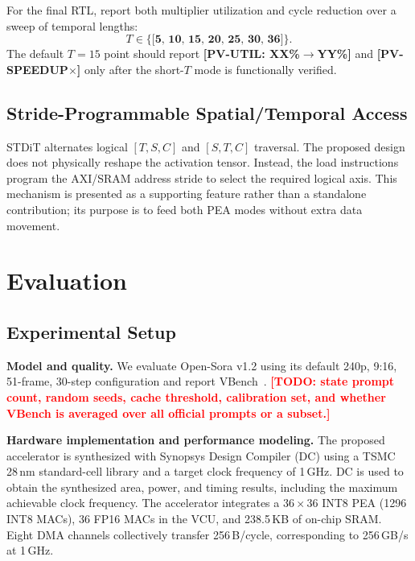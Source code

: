 \documentclass[conference]{IEEEtran}
\newcommand{\ModelName}{Open-Sora v1.2}
\newcommand{\TechNode}{TSMC 28\,nm}
\newcommand{\Frequency}{1\,GHz}
\newcommand{\SRAMCapacity}{238.5\,KB}
\newcommand{\MemoryBandwidth}{256\,GB/s}
\newcommand{\INTEightMACs}{1296}
\newcommand{\FPSixteenMACs}{36}
\newcommand{\PVTemporalUtilGain}{\textbf{[PV-UTIL: XX\%$\rightarrow$YY\%]}}
\newcommand{\PVTemporalSpeedup}{\textbf{[PV-SPEEDUP$\times$]}}
\newcommand{\TODO}[1]{\textcolor{red}{\textbf{[TODO: #1]}}}
\begin{document}
For the final RTL, report both multiplier utilization and cycle reduction over
a sweep of temporal lengths:
\begin{equation}
T\in\{\textbf{[5, 10, 15, 20, 25, 30, 36]}\}.
\end{equation}
The default $T=15$ point should report \PVTemporalUtilGain{} and
\PVTemporalSpeedup{} only after the short-$T$ mode is functionally verified.

\subsection{Stride-Programmable Spatial/Temporal Access}

STDiT alternates logical $[T,S,C]$ and $[S,T,C]$ traversal. The proposed design does not
physically reshape the activation tensor. Instead, the load instructions
program the AXI/SRAM address stride to select the required logical axis. This
mechanism is presented as a supporting feature rather than a standalone
contribution; its purpose is to feed both PEA modes without extra data
movement.

\section{Evaluation}
\label{sec:eval}

\subsection{Experimental Setup}

\textbf{Model and quality.}
We evaluate \ModelName{} using its default 240p, 9:16, 51-frame,
30-step configuration and report VBench~\cite{huang2024vbench}.
\TODO{state prompt count, random seeds, cache threshold, calibration set,
and whether VBench is averaged over all official prompts or a subset.}

\textbf{Hardware implementation and performance modeling.}
The proposed accelerator is synthesized with Synopsys Design Compiler (DC)
using a \TechNode{} standard-cell library and a target clock frequency of
\Frequency{}. DC is used to obtain the synthesized area, power, and timing
results, including the maximum achievable clock frequency. The accelerator
integrates a $36\times36$ INT8 PEA (\INTEightMACs{} INT8 MACs),
\FPSixteenMACs{} FP16 MACs in the VCU, and \SRAMCapacity{} of on-chip SRAM.
Eight DMA channels collectively transfer 256\,B/cycle, corresponding to
\MemoryBandwidth{} at 1\,GHz.
\end{document}
